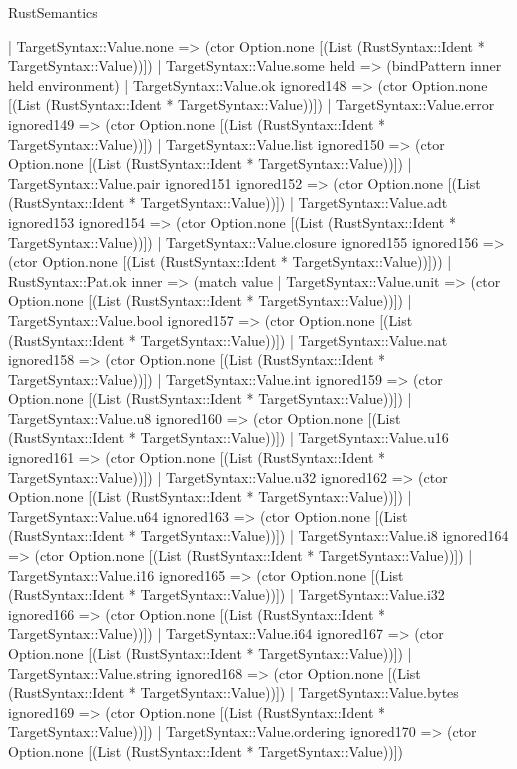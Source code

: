 \begin{lexlean}{RustSemantics}
\begin{semanticmodule}
{      | TargetSyntax::Value.none => (ctor Option.none [(List (RustSyntax::Ident * TargetSyntax::Value))])
      | TargetSyntax::Value.some held => (bindPattern inner held environment)
      | TargetSyntax::Value.ok ignored148 => (ctor Option.none [(List (RustSyntax::Ident * TargetSyntax::Value))])
      | TargetSyntax::Value.error ignored149 => (ctor Option.none [(List (RustSyntax::Ident * TargetSyntax::Value))])
      | TargetSyntax::Value.list ignored150 => (ctor Option.none [(List (RustSyntax::Ident * TargetSyntax::Value))])
      | TargetSyntax::Value.pair ignored151 ignored152 => (ctor Option.none [(List (RustSyntax::Ident * TargetSyntax::Value))])
      | TargetSyntax::Value.adt ignored153 ignored154 => (ctor Option.none [(List (RustSyntax::Ident * TargetSyntax::Value))])
      | TargetSyntax::Value.closure ignored155 ignored156 => (ctor Option.none [(List (RustSyntax::Ident * TargetSyntax::Value))]))
    | RustSyntax::Pat.ok inner => (match value
      | TargetSyntax::Value.unit => (ctor Option.none [(List (RustSyntax::Ident * TargetSyntax::Value))])
      | TargetSyntax::Value.bool ignored157 => (ctor Option.none [(List (RustSyntax::Ident * TargetSyntax::Value))])
      | TargetSyntax::Value.nat ignored158 => (ctor Option.none [(List (RustSyntax::Ident * TargetSyntax::Value))])
      | TargetSyntax::Value.int ignored159 => (ctor Option.none [(List (RustSyntax::Ident * TargetSyntax::Value))])
      | TargetSyntax::Value.u8 ignored160 => (ctor Option.none [(List (RustSyntax::Ident * TargetSyntax::Value))])
      | TargetSyntax::Value.u16 ignored161 => (ctor Option.none [(List (RustSyntax::Ident * TargetSyntax::Value))])
      | TargetSyntax::Value.u32 ignored162 => (ctor Option.none [(List (RustSyntax::Ident * TargetSyntax::Value))])
      | TargetSyntax::Value.u64 ignored163 => (ctor Option.none [(List (RustSyntax::Ident * TargetSyntax::Value))])
      | TargetSyntax::Value.i8 ignored164 => (ctor Option.none [(List (RustSyntax::Ident * TargetSyntax::Value))])
      | TargetSyntax::Value.i16 ignored165 => (ctor Option.none [(List (RustSyntax::Ident * TargetSyntax::Value))])
      | TargetSyntax::Value.i32 ignored166 => (ctor Option.none [(List (RustSyntax::Ident * TargetSyntax::Value))])
      | TargetSyntax::Value.i64 ignored167 => (ctor Option.none [(List (RustSyntax::Ident * TargetSyntax::Value))])
      | TargetSyntax::Value.string ignored168 => (ctor Option.none [(List (RustSyntax::Ident * TargetSyntax::Value))])
      | TargetSyntax::Value.bytes ignored169 => (ctor Option.none [(List (RustSyntax::Ident * TargetSyntax::Value))])
      | TargetSyntax::Value.ordering ignored170 => (ctor Option.none [(List (RustSyntax::Ident * TargetSyntax::Value))])
}
\end{semanticmodule}
\end{lexlean}
